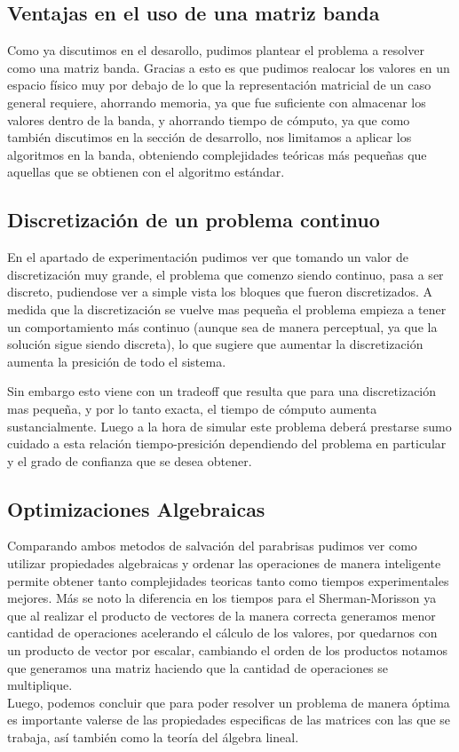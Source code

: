 \subsection{Ventajas en el uso de una matriz banda}

Como ya discutimos en el desarollo, pudimos plantear el problema a resolver como una matriz banda. Gracias a esto es que pudimos realocar los valores en un espacio físico muy por debajo de lo que la representación matricial de un caso general requiere, ahorrando memoria, ya que fue suficiente con almacenar los valores dentro de la banda, y ahorrando tiempo de cómputo, ya que como también discutimos en la sección de desarrollo, nos limitamos a aplicar los algoritmos en la banda, obteniendo complejidades teóricas más pequeñas que aquellas que se obtienen con el algoritmo estándar.

\subsection{Discretización de un problema continuo}

En el apartado de experimentación pudimos ver que tomando un valor de discretización muy grande, el problema que comenzo siendo continuo, pasa a ser discreto, pudiendose ver a simple vista los bloques que fueron discretizados. A medida que la discretización se vuelve mas pequeña el problema empieza a tener un comportamiento más continuo (aunque sea de manera perceptual, ya que la solución sigue siendo discreta), lo que sugiere que aumentar la discretización aumenta la presición de todo el sistema.

Sin embargo esto viene con un tradeoff que resulta que para una discretización mas pequeña, y por lo tanto exacta, el tiempo de cómputo aumenta sustancialmente. Luego a la hora de simular este problema deberá prestarse sumo cuidado a esta relación tiempo-presición dependiendo del problema en particular y el grado de confianza que se desea obtener.

\subsection{Optimizaciones Algebraicas}

Comparando ambos metodos de salvación del parabrisas pudimos ver como utilizar propiedades algebraicas y ordenar las operaciones de manera inteligente permite obtener tanto complejidades teoricas tanto como tiempos experimentales mejores. Más se noto la diferencia en los tiempos para el Sherman-Morisson ya que al realizar el producto de vectores de la manera correcta generamos menor cantidad de operaciones acelerando el cálculo de los valores, por quedarnos con un producto de vector por escalar, cambiando el orden de los productos notamos que generamos una matriz haciendo que la cantidad de operaciones se multiplique.
\\
Luego, podemos concluir que para poder resolver un problema de manera óptima es importante valerse de las propiedades especificas de las matrices con las que se trabaja, así también como la teoría del álgebra lineal.

